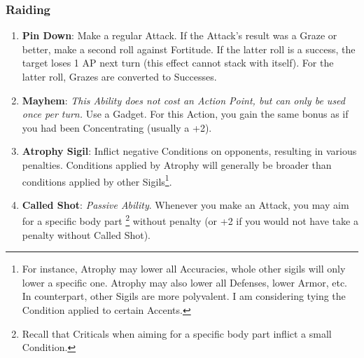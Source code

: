 \subsubsection{Raiding}
\begin{enumerate}
    \item \textbf{Pin Down}: Make a regular Attack. If the Attack's result was a Graze or better, make a second roll against Fortitude. If the latter roll is a success, the target loses 1 AP next turn (this effect cannot stack with itself). For the latter roll, Grazes are converted to Successes.
    \item \textbf{Mayhem}: \textit{This Ability does not cost an Action Point, but can only be used once per turn.} Use a Gadget. For this Action, you gain the same bonus as if you had been Concentrating (usually a +2).
    \item \textbf{Atrophy Sigil}: Inflict negative Conditions on opponents, resulting in various penalties. Conditions applied by Atrophy will generally be broader than conditions applied by other Sigils\footnote{For instance, Atrophy may lower all Accuracies, whole other sigils will only lower a specific one. Atrophy may also lower all Defenses, lower Armor, etc. In counterpart, other Sigils are more polyvalent. I am considering tying the Condition applied to certain Accents.}.
    \item \textbf{Called Shot}: \textit{Passive Ability}. Whenever you make an Attack, you may aim for a specific body part \footnote{Recall that Criticals when aiming for a specific body part inflict a small Condition.} without penalty (or +2 if you would not have take a penalty without Called Shot).
\end{enumerate}


